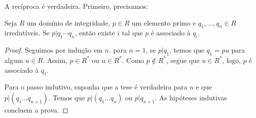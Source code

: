 A recíproca é verdadeira. Primeiro, precisamos:

\begin{lemma}
Seja $R$ um domínio de integridade, $p\in R$ um elemento primo e $q_1, \dots, q_n\in R$ irredutíveis.
Se $p|q_1\cdots q_n$, então existe $i$ tal que $p$ é associado à $q_i$.
\end{lemma}
\begin{proof}
Seguimos por indução em $n$.
para $n=1$, se $p|q_1$, temos que $q_1=pu$ para algum $u\in R$.
Assim, $p\in R^*$ ou $u\in R^*$.
Como $p \notin R^*$, segue que $u \in R^*$, logo, $p$ é associado à $q_1$.

Para o passo indutivo, suponha que a tese é verdadeira para $n$ e que $p|(q_1\dots q_{n+1})$.
Temos que $p|(q_1\dots q_{n})$ ou $p|q_{n+1}$.
As hipóteses indutivas concluem a prova.
\end{proof}

